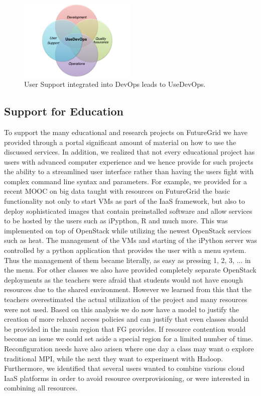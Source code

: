 \documentclass{article}
\begin{document}
\begin{figure}[htb]
  \centering
    \includegraphics[width=0.5\textwidth]{images/usedevops.pdf}
  \caption{User Support integrated into DevOps leads to UseDevOps.}
  \label{F:usedevops}
\end{figure}


\subsection{Support for Education}

To support the many educational and research projects on FutureGrid we have provided through a portal significant amount of material on how to use the discussed services. In addition, we realized that not every educational project has users with advanced computer experience and we hence provide for such projects the ability to a streamlined user interface rather than having the users fight with complex command line syntax and parameters. For example, we provided for a recent MOOC on big data taught with resources on FutureGrid the basic functionality not only to start VMs as part of the IaaS framework, but also to deploy sophisticated images that contain preinstalled software and allow services to be hosted by the users such as iPypthon, R and much more. This was implemented on top of OpenStack while utilizing the newest OpenStack services such as heat. The management of the VMs and starting of the iPython server was controlled by a python application that provides the user with a menu system. Thus the management of them became literally, as easy as pressing 1, 2, 3, ... in the menu. For other classes we also have provided completely separate OpenStack deployments as the teachers were afraid that students would not have enough resources due to the shared environment. However we learned from this that the teachers overestimated the actual utilization of the project and many resources were not used. Based on this analysis we do now have a model to justify the creation of more relaxed access policies and can justify that even classes should be provided in the main region that FG provides. If resource contention would become an issue we could set aside a special region for a limited number of time. Reconfiguration needs have also arisen where one day a class may want o explore traditional MPI, while the next they want to experiment with Hadoop. Furthermore, we identified that several users wanted to combine various cloud IaaS platforms in order to avoid resource overprovisioning, or were interested in combining all resources. 
\end{document}
